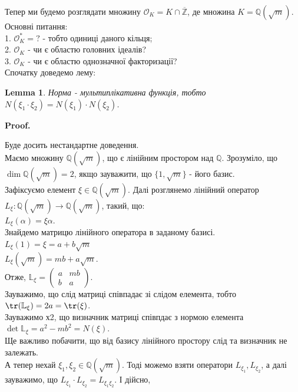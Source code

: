 \documentclass[a4paper, 10pt]{article}
\makeatletter
\theoremstyle{theoremdd}
\theoremstyle{theoremdd}
\theoremstyle{theoremdd}
\theoremstyle{theoremdd}
\theoremstyle{theoremdd}
\theoremstyle{theoremdd}
\theoremstyle{theoremdd}
\newtheorem{lemma}[theorem]{Lemma}
\theoremstyle{theoremdd}
\renewenvironment{proof}[1][Proof.\\]{\par
\pushQED{\hfill \qed}%
\normalfont \topsep6\p@\@plus6\p@\relax
\trivlist
\item\relax
{\bfseries
#1\@addpunct{.}}\hspace\labelsep\ignorespaces
}{%
\popQED\endtrivlist\@endpefalse
}
\makeatother
\begin{document}
Тепер ми будемо розглядати множину $\mathcal{O}_K = K \cap \overline{\mathbb{Z}}$, де множина $K = \mathbb{Q}(\sqrt{m})$.\\
Основні питання:\\
1. $\mathcal{O}^*_K = ?$ - тобто одиниці даного кільця;\\
2. $\mathcal{O}_K$ - чи є областю головних ідеалів?\\
3. $\mathcal{O}_K$ - чи є областю однозначної факторизації?
\bigskip \\
Спочатку доведемо лему:
\begin{lemma}
Норма - мультиплікативна функція, тобто\\
$N(\xi_1 \cdot \xi_2) = N(\xi_1) \cdot N(\xi_2)$.
\end{lemma}

\begin{proof}
Буде досить нестандартне доведення.\\
Маємо множину $\mathbb{Q}(\sqrt{m})$, що є лінійним простором над $\mathbb{Q}$. Зрозуміло, що $\dim \mathbb{Q}(\sqrt{m}) = 2$, якщо зауважити, що $\{1, \sqrt{m}\}$ - його базис.\\
Зафіксуємо елемент $\xi \in \mathbb{Q}(\sqrt{m})$. Далі розглянемо лінійний оператор $L_\xi: \mathbb{Q}(\sqrt{m}) \to \mathbb{Q}(\sqrt{m})$, такий, що:\\
$L_\xi(\alpha) = \xi \alpha$.\\
Знайдемо матрицю лінійного оператора в заданому базисі.\\
$L_\xi(1) = \xi = a + b \sqrt{m}$\\
$L_\xi(\sqrt{m}) = mb + a\sqrt{m}$.\\
Отже, $\mathbb{L}_\xi = \begin{pmatrix}
a & mb \\
b & a
\end{pmatrix}$.\\
Зауважимо, що слід матриці співпадає зі слідом елемента, тобто\\
$\tr (\mathbb{L}_\xi) = 2a = \tr(\xi)$.\\
Зауважимо х2, що визначник матриці співпдає з нормою елемента\\
$\det \mathbb{L}_\xi = a^2 - mb^2 = N(\xi)$.\\
Ще важливо побачити, що від базису лінійного простору слід та визначник не залежать.\\
А тепер нехай $\xi_1,\xi_2 \in \mathbb{Q}(\sqrt{m})$. Тоді можемо взяти оператори $L_{\xi_1}, L_{\xi_2}$, а далі зауважимо, що $L_{\xi_1} \cdot L_{\xi_2} = L_{\xi_1 \xi_2}$. І дійсно,\\

\end{proof}
\end{document}

